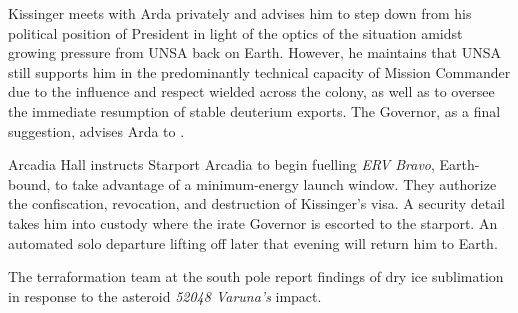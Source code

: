 Kissinger meets with Arda privately and advises him to step down from his political position of President in light of the optics of the situation amidst growing pressure from UNSA back on Earth. However, he maintains that UNSA still supports him in the predominantly technical capacity of Mission Commander due to the influence and respect wielded across the colony, as well as to oversee the immediate resumption of stable deuterium exports. The Governor, as a final suggestion, advises Arda to .
\StopTimelineDate

Arcadia Hall instructs Starport Arcadia to begin fuelling {\it ERV Bravo}, Earth-bound, to take advantage of a minimum-energy launch window. They authorize the confiscation, revocation, and destruction of Kissinger's visa. A security detail takes him into custody where the irate Governor is escorted to the starport. An automated solo departure lifting off later that evening will return him to Earth.
\StopTimelineDate

The terraformation team at the south pole report findings of dry ice sublimation in response to the asteroid {\it 52048 Varuna's} impact.
\StopTimelineDate

